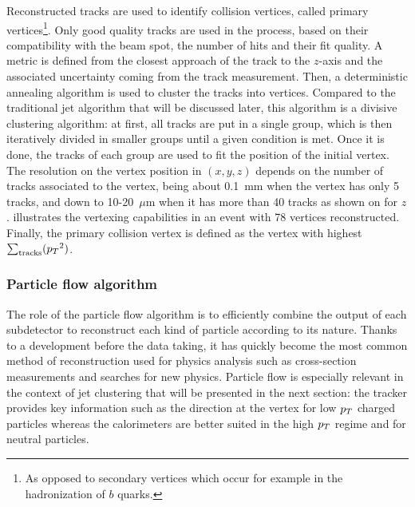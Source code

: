         Reconstructed tracks are used to identify collision vertices, called primary
        vertices\footnote{As opposed to secondary vertices which occur for example in the
        hadronization of $b$ quarks.}. Only good quality tracks are used in the process, based on their
        compatibility with the beam spot, the number of hits and their fit quality. A
        metric is defined from the closest approach of the track to the $z$-axis and
        the associated uncertainty coming from the track measurement. Then, a deterministic
        annealing algorithm \cite{DAclustering} is used to cluster the tracks into vertices. Compared to the
        traditional jet algorithm that will be discussed later, this algorithm is a divisive
        clustering algorithm: at first, all tracks are put in a single group, which is then
        iteratively divided in smaller groups until a given condition is met. Once it is
        done, the tracks of each group are used to fit the position of the initial vertex.
        The resolution on the vertex position in $(x,y,z)$ depends on the number of tracks
        associated to the vertex, being about 0.1~mm when the vertex has only 5 tracks, and
        down to 10-20~$\mu$m when it has more than 40 tracks as shown on  for $z$.
         illustrates the vertexing capabilities in an event with
        78 vertices reconstructed. Finally, the primary collision vertex is defined as the
        vertex with highest $\sum_\text{tracks} ({p_T}^2)$.


            \subsubsection{Particle flow algorithm}

        The role of the particle flow algorithm \cite{particleFlow} is to efficiently combine the output of each
        subdetector to reconstruct each kind of particle according to its nature. Thanks
        to a development before the data taking, it has quickly become the most common
        method of reconstruction used for physics analysis such as cross-section measurements
        and searches for new physics. Particle flow is especially relevant in the context
        of jet clustering that will be presented in the next section: the tracker provides
        key information such as the direction at the vertex for low $p_T$ charged particles
        whereas the calorimeters are better suited in the high $p_T$ regime and for neutral
        particles.

